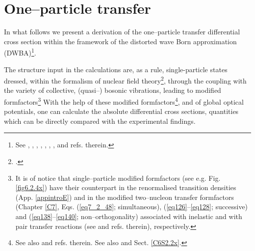 \chapter{One--particle transfer}\label{C6}
In what follows we present a derivation of the one--particle transfer differential cross section within the framework of the distorted wave Born approximation (DWBA)\footnote{See \cite{Tobocman:61}, \cite{Austern:63}, \cite{Jackson:70} \citet{Satchler:80,Broglia:04a}, \cite{Satchler:83}, \cite{Austern:70}, \cite{Glendenning:04}, \cite{Thompson:09},  and refs. therein.}.




 The structure input in the calculations are, as a rule,  single-particle states dressed, within the formalism of nuclear field theory\footnote{ \cite{Bes:74,Bes:75,Bohr:75,Bes:76c,Bes:76a,Bes:76b,Mottelson:76,Broglia:76,Bes:77,Bortignon:77,Bes:90}.}, through the coupling with the variety of collective, (quasi--) bosonic vibrations, leading to modified formfactors\footnote{It is of notice that single--particle modified formfactors (see e.g. Fig. \ref{fig6.2.4x}) have their counterpart in the renormalised transition densities (App. \ref{appintroE})  and in the modified two--nucleon transfer formfactors (Chapter \ref{C7}, Eqs. (\ref{eq7_2_48}; simultaneous), (\ref{eq126}--\ref{eq128}; successive) and (\ref{eq138}--\ref{eq140}; non--orthogonality) associated with inelastic and with pair transfer  reactions  (see \cite{Broglia:73,Potel:13} and refs. therein), respectively.} With the help of these modified formfactors\footnote{See also \cite{Vaagen:79,Bang:80,Hamamoto:70} and refs. therein. See also \cite{Barranco:17} and Sect. \ref{C6S2.2x}.}, and of global optical potentials, one can calculate the absolute differential cross sections, quantities which can  be directly compared with the experimental findings.
	
